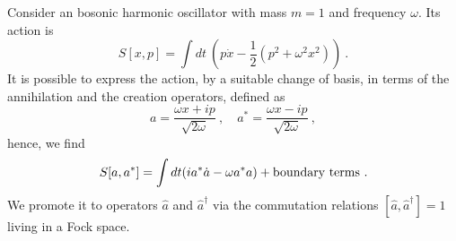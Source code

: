     Consider an bosonic harmonic oscillator with mass $m = 1$ and frequency $\omega$. Its action is 
    \begin{equation}\label{f:harmac}
        S[x, p] = \int dt ~ (p \dot x - \frac{1}{2} (p^2 + \omega^2 x^2)) ~.
    \end{equation}
    It is possible to express the action, by a suitable change of basis, in terms of the annihilation and the creation operators, defined as
    \begin{equation}\label{f:ladd}
        a = \frac{\omega x + i p}{\sqrt{2 \omega}} ~, \quad a^* = \frac{\omega x - i p}{\sqrt{2 \omega}} ~, 
    \end{equation}
    hence, we find
    \begin{equation*}
        S[a, a^*] = \int dt (i a^* \dot a - \omega a^* a) + \textnormal{boundary terms} ~.
    \end{equation*}
    We promote it to operators $\hat a$ and $\hat a^\dagger$ via the commutation relations $[\hat a, \hat a^\dagger] = 1$ living in a Fock space. 
